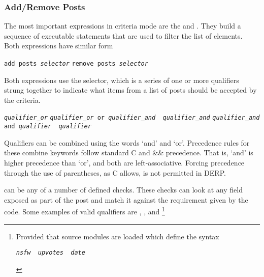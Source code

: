 \subsubsection{Add/Remove Posts}
The most important expressions in criteria mode are the  and . They build a sequence of
executable statements that are used to filter the list of elements. Both expressions have similar form
\begin{description}[labelindent=1cm,leftmargin=\onelen,labelwidth=1cm]
      \texttt{add posts \textit{selector}}
      \texttt{remove posts \textit{selector}}
\end{description}
Both expressions use the selector, which is a series of one or more qualifiers strung together to indicate what
items from a list of posts should be accepted by the criteria.
\begin{description}[labelindent=1cm,leftmargin=\onelen,labelwidth=1cm]
     \texttt{\textit{qualifier\_or}}
      \texttt{\textit{qualifier\_or} or \textit{qualifier\_and} \textbf{\textbar} \textit{qualifier\_and}}
      \texttt{\textit{qualifier\_and} and \textit{qualifier} \textbf{\textbar} \textit{qualifier}}
\end{description}
Qualifiers can be combined using the words ‘and’ and ‘or’. Precedence rules for these combine keywords follow standard
C \textbar\textbar and \&\& precedence. That is, ‘and’ is higher precedence than ‘or’, and both are left-associative. Forcing precedence
through the use of parentheses, as C allows, is not permitted in DERP.

 can be any of a number of defined checks. These checks can look at any field exposed as part of the post and
match it against the requirement given by the code. Some examples of valid qualifiers are ,
, and \footnote{Provided that source modules are loaded which define the syntax
\begin{description}[labelindent=1cm,leftmargin=\onelen,labelwidth=1cm]
  \texttt{\textit{nsfw} \textbf{\textbar} \textit{upvotes} \textbf{\textbar} \textit{date}}
\end{description}}

\begin{description}[labelindent=1cm,leftmargin=\onelen,labelwidth=1cm]
    
  \textbf{\textbar} 
  \textbf{\textbar} 
  \textbf{\textbar} 
  \textbf{\textbar} 
  \textbf{\textbar} 
  \textbf{\textbar} 
\end{description}

